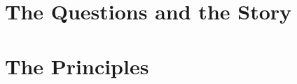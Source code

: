 \documentclass[11pt,twoside,openright]{memoir}
\begin{document}
\makecover
\cleardoublepage

\frontmatter
\titlingpageend{\clearpage}{\clearpage}  %



\tableofcontents*
\listoffigures*


\mainmatter
\part{The Questions and the Story}


\part{The Principles}











\backmatter
\end{document}
